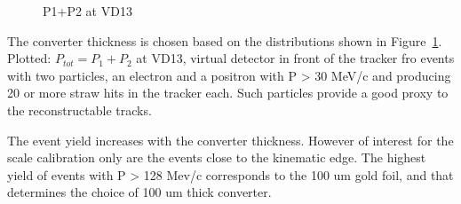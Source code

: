 \begin{figure}[H]
  \caption{
    \label{figure:sum_mom_vd13}
    P1+P2 at VD13
  }
\end{figure}

The converter thickness is chosen based on the distributions shown in Figure~\ref{figure:sum_mom_vd13}.
Plotted: $P_{tot} = P_1 + P_2$ at VD13, virtual detector in front of the tracker fro events with
two particles, an electron and a positron with P > 30 MeV/c and producing 20 or more straw hits in the tracker each.
Such particles provide a good proxy to the reconstructable tracks.

The event yield increases with the converter thickness. However of interest for the scale calibration only
are the events close to the kinematic edge.
The highest yield of events with P > 128 Mev/c corresponds to the 100 um gold foil, and that determines
the choice of 100 um thick converter.

